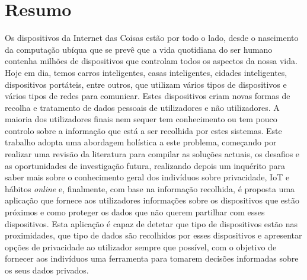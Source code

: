 %
%
\chapter*{Resumo}
\justify

Os dispositivos da Internet das Coisas estão por todo o lado, desde
o nascimento da computação ubíqua que se prevê que a vida quotidiana
do ser humano contenha milhões de dispositivos que controlam todos os
aspectos da nossa vida. Hoje em dia, temos carros inteligentes, casas
inteligentes, cidades inteligentes, dispositivos portáteis, entre
outros, que utilizam vários tipos de dispositivos e vários tipos de
redes para comunicar. Estes dispositivos criam novas formas de recolha
e tratamento de dados pessoais de utilizadores e não utilizadores.
A maioria dos utilizadores finais nem sequer tem conhecimento ou tem
pouco controlo sobre a informação que está a ser recolhida por
estes sistemas. Este trabalho adopta uma abordagem holística a este
problema, começando por realizar uma revisão da literatura para
compilar as soluções actuais, os desafios e as oportunidades de
investigação futura, realizando depois um inquérito para saber mais
sobre o conhecimento geral dos indivíduos sobre privacidade, IoT e
hábitos \textit{online} e, finalmente, com base na informação recolhida,
é proposta uma aplicação que fornece aos utilizadores informações
sobre os dispositivos que estão próximos e como proteger os dados
que não querem partilhar com esses dispositivos.
Esta aplicação é capaz de detetar que tipo de dispositivos estão nas
proximidades, que tipo de dados são recolhidos por esses dispositivos
e apresentar opções de privacidade ao utilizador sempre que possível,
com o objetivo de fornecer aos indivíduos uma ferramenta para tomarem
decisões informadas sobre os seus dados privados.

